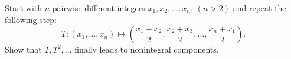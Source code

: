 Start with $n$ pairwise different integers $x_1, x_2, \ldots, x_n$, $(n > 2)$ and repeat the following step:
\[ T : (x_1, \ldots, x_n) \mapsto \left(\frac{x_1 + x_2}{2}, \frac{x_2 + x_3}{2}, \ldots, \frac{x_n + x_1}{2}\right). \]
Show that $T, T^2, \ldots$ finally leads to nonintegral components.
